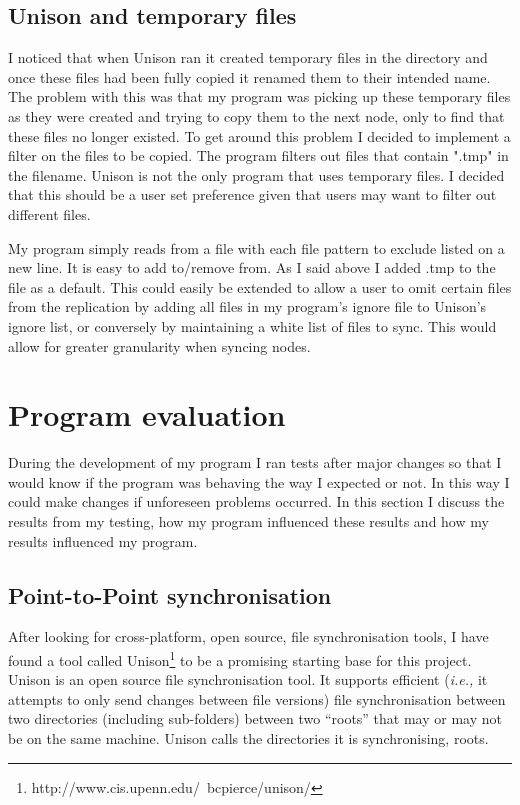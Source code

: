 \documentclass[12pt]{article}
\begin{document}
\subsection{Unison and temporary files}
\label{sec:uni_and_tmp}
I noticed that when Unison ran it created temporary files in the
directory and once these files had been fully copied it renamed
them to their intended name. The problem with this was that my program
was picking up these temporary files as they were created and trying to
copy them to the next node, only to find that these files no longer existed.
To get around this problem I decided to implement a filter on the files to
be copied. The program filters out files that contain ".tmp" in the filename.
Unison is not the only program that uses temporary files. I decided that this
should be a user set preference given that users may want to filter out different
files.

My program simply reads from a file with each file pattern to exclude
listed on a new line. It is easy to add to/remove from. As I said above
I added .tmp to the file as a default. This could easily be extended
to allow a user to omit certain files from the replication by adding
all files in my program's ignore file to Unison's ignore list, or conversely
by maintaining a white list of files to sync. This would allow for
greater granularity when syncing nodes.

\newpage
\section{Program evaluation}
During the development of my program I ran tests after major
changes so that I would know if the program was behaving the
way I expected or not. In this way I could make changes if
unforeseen problems occurred. In this section I discuss
the results from my testing, how my program influenced these
results and how my results influenced my program.

\subsection{Point-to-Point synchronisation}
\label{sec:point_to_point}
After looking for cross-platform, open source, file synchronisation
tools, I have found a tool called
Unison\footnote{http://www.cis.upenn.edu/~bcpierce/unison/}
to be a promising starting
base for this project. Unison is an open source file synchronisation tool.
It supports efficient (\emph{i.e.,} it attempts to only send changes between file versions) file synchronisation between two
directories (including sub-folders) between two ``roots''
that may or may not be on the same machine. Unison calls the
directories it is synchronising, roots.
\end{document}
